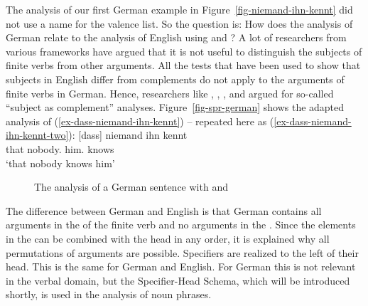 The analysis of our first German example in Figure~\ref{fig-niemand-ihn-kennt} did not use a name
for the valence list. So the question is: How does the analysis of German relate to the analysis of
English using \spr and \comps? A lot of researchers from various frameworks have argued that it is not
useful to distinguish the subjects of finite verbs from other arguments. All the tests that have
been used to show that subjects in English differ from complements do not apply to the arguments of
finite verbs in German. Hence, researchers like \citet[]{Pollard90a}, \citet[Section~6.3.2]{Haider93a}, 
\citet[]{Eisenberg94b}, and \citet[, 78]{Kiss95a} argued for so-called ``subject as complement''
analyses.
Figure~\vref{fig-spr-german} shows the adapted analysis of
(\ref{ex-dass-niemand-ihn-kennt}) -- repeated here as
(\ref{ex-dass-niemand-ihn-kennt-two}):
\ea
\label{ex-dass-niemand-ihn-kennt-two}
\gll  {}[dass] niemand ihn kennt\\
      \spacebr{}that nobody.\NOM{} him.\ACC{} knows\\ 
\glt `that nobody knows him'
\z
\begin{figure}
\caption{\label{fig-spr-german}The analysis of a German sentence with \spr and \compsl}
\end{figure}
The difference between German and English is that German contains all arguments in the \compsl of
the finite verb and no arguments in the \sprl. Since the elements in the \compsl can be combined
with the head in any order, it is explained why all permutations of arguments are
possible. Specifiers are realized to the left of their head. This is the same for German and
English. For German this is not relevant in the verbal domain, but the Specifier-Head Schema, which
will be introduced shortly, is used in the analysis of noun phrases.

